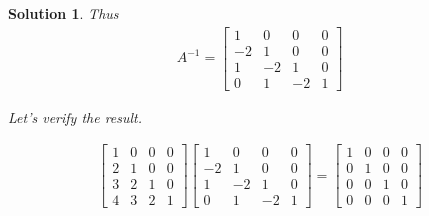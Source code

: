 \documentclass{article}
\newtheorem*{solution}{Solution}
\begin{document}
\begin{solution}
Thus \begin{align*}
A^{-1} = \begin{bmatrix}
1 & 0 & 0 & 0 \\
-2 & 1 & 0 & 0 \\
1 & -2 & 1 & 0 \\
0 & 1 & -2 & 1
\end{bmatrix}
\end{align*}

Let's verify the result.

\begin{align*}
\begin{bmatrix}
1 & 0 & 0 & 0 \\
2 & 1 & 0 & 0 \\
3 & 2 & 1 & 0 \\
4 & 3 & 2 & 1
\end{bmatrix}
\begin{bmatrix}
1 & 0 & 0 & 0 \\
-2 & 1 & 0 & 0 \\
1 & -2 & 1 & 0 \\
0 & 1 & -2 & 1
\end{bmatrix}
=
\begin{bmatrix}
1 & 0 & 0 & 0 \\
0 & 1 & 0 & 0 \\
0 & 0 & 1 & 0 \\
0 & 0 & 0 & 1
\end{bmatrix}
\end{align*}

\end{solution}
\end{document}
